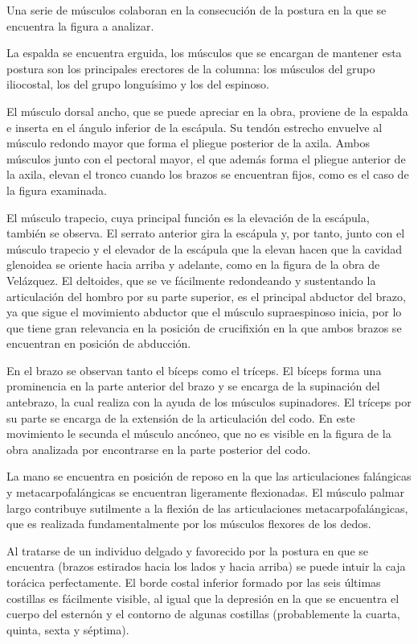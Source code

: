 Una serie de músculos colaboran en la consecución de la postura en la que se encuentra la figura a analizar.

La espalda se encuentra erguida, los músculos que se encargan de mantener esta postura son los principales erectores de la columna: los músculos del grupo iliocostal, los del grupo longuísimo y los del espinoso.

El músculo dorsal ancho, que se puede apreciar en la obra, proviene de la espalda e inserta en el ángulo inferior de la escápula. Su tendón estrecho envuelve al músculo redondo mayor que forma el pliegue posterior de la axila. Ambos músculos junto con el pectoral mayor, el que además forma el pliegue anterior de la axila, elevan el tronco cuando los brazos se encuentran fijos, como es el caso de la figura examinada.

El músculo trapecio, cuya principal función es la elevación de la escápula, también se observa. El serrato anterior gira la escápula y, por tanto, junto con el músculo trapecio y el elevador de la escápula que la elevan hacen que la cavidad glenoidea se oriente hacia arriba y adelante, como en la figura de la obra de Velázquez.
El deltoides, que se ve fácilmente redondeando y sustentando la articulación del hombro por su parte superior, es el principal abductor del brazo, ya que sigue el movimiento abductor que el músculo supraespinoso inicia, por lo que tiene gran relevancia en la posición de crucifixión en la que ambos brazos se encuentran en posición de abducción.

En el brazo se observan tanto el bíceps como el tríceps. El bíceps forma una prominencia en la parte anterior del brazo y se encarga de la supinación del antebrazo, la cual realiza con la ayuda de los músculos supinadores. El tríceps por su parte se encarga de la extensión de la articulación del codo. En este movimiento le secunda el músculo ancóneo, que no es visible en la figura de la obra analizada por encontrarse en la parte posterior del codo.

La mano se encuentra en posición de reposo en la que las articulaciones falángicas y metacarpofalángicas se encuentran ligeramente flexionadas. El músculo palmar largo contribuye sutilmente a la flexión de las articulaciones metacarpofalángicas, que es realizada fundamentalmente por los músculos flexores de los dedos.

Al tratarse de un individuo delgado y favorecido por la postura en que se encuentra (brazos estirados hacia los lados y hacia arriba) se puede intuir la caja torácica perfectamente. El borde costal inferior formado por las seis últimas costillas es fácilmente visible, al igual que la depresión en la que se encuentra el cuerpo del esternón y el contorno de algunas costillas (probablemente la cuarta, quinta, sexta y séptima).

